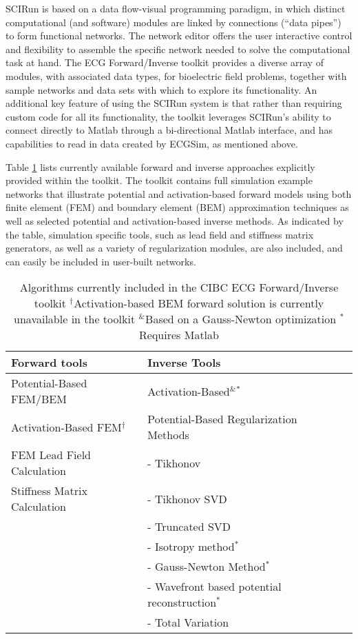 SCIRun is based on a data flow-visual programming paradigm, in which distinct
computational (and software) modules are linked by connections (``data
pipes'') to form functional networks. The network editor offers the user
interactive control and flexibility to assemble the specific network needed to
solve the computational task at hand.
The ECG Forward/Inverse toolkit provides
a diverse array of modules, with associated data types, for bioelectric field problems,
together with sample networks and data sets with which to explore its
functionality.
An additional key feature of using the SCIRun system is
that rather than requiring custom code for all its functionality, the
toolkit leverages SCIRun's ability to
connect directly to Matlab through a
bi-directional Matlab interface, and has capabilities to read in data
created by ECGSim, as mentioned above.

Table \ref{tab:prop} lists currently available forward and inverse
approaches explicitly provided within the toolkit. The toolkit contains
full simulation example networks that illustrate potential and
activation-based forward models using both finite element (FEM) and boundary
element (BEM) approximation techniques as well as selected potential and
activation-based inverse methods. As indicated by the table,
simulation specific tools, such as lead field and stiffness matrix
generators, as well as a variety of regularization modules, are also
included, and can easily be included in user-built networks.

\begin{table}[htb]
\begin{tabular}{|ll|l|}
\hline
{\bf Forward tools} & {\bf Inverse Tools}\\ \hline
\hline
Potential-Based FEM/BEM & Activation-Based$^{\&}$$^{*}$\\ \hline
Activation-Based FEM$^{\dag}$ & Potential-Based Regularization  Methods\\ \hline
FEM Lead Field Calculation &   -  Tikhonov  \\ \hline
Stiffness Matrix Calculation &- Tikhonov SVD  \\ \hline
 & - Truncated SVD\\ \hline
 & - Isotropy method$^{*}$\\ \hline
 & - Gauss-Newton Method$^{*}$\\ \hline
 & - Wavefront based potential reconstruction$^*$\\ \hline
 & - Total Variation \\ \hline
\end{tabular}
\caption{Algorithms currently included in the CIBC ECG Forward/Inverse
toolkit \newline
$^\dag$Activation-based BEM forward solution is currently
unavailable in the toolkit \newline
$^{\&}$Based on a Gauss-Newton optimization \newline
$^{*}$Requires Matlab
}
\label{tab:prop}
\end{table}

